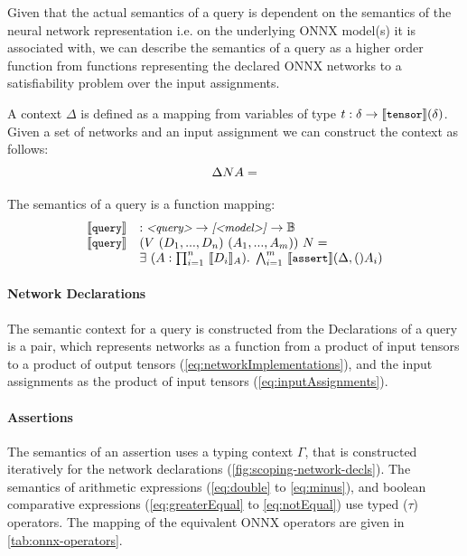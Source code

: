 Given that the actual semantics of a \vnnlib{} query is dependent on the semantics of the neural network representation i.e. on the underlying ONNX model(s) it is associated with, we can describe the semantics of a query as a higher order function from functions representing the declared ONNX networks to a satisfiability problem over the input assignments. 

A context $\Delta$ is defined as a mapping from variables of type $t : \delta \rightarrow \llbracket \texttt{\small tensor} \rrbracket(\delta)$. Given a set of networks and an input assignment we can construct the context as follows:
\begin{equation*}
\Delta N A =  
\end{equation*}


The semantics of a query is a function mapping:
\begin{equation*}
\begin{array}{lll}
\llbracket \texttt{\small query} \rrbracket & : \text{\small \textit{<query>}} \rightarrow \text{\small \textit{[<model>]}} \rightarrow \mathbb{B} \\
\llbracket \texttt{\small query} \rrbracket & (V~(D_1,...,D_n)~(A_1,...,A_m))~N = \\
    & \exists~(A : \prod^{n}_{i=1}~\llbracket D_i \rrbracket_A). \; \bigwedge^{m}_{i=1}~\llbracket \texttt{\small assert} \rrbracket(\Delta,()A_i) \\
\end{array}
\end{equation*}

 
\paragraph{Network Declarations}
The semantic context for a \vnnlib{} query is constructed from the Declarations of a \vnnlib{} query is a pair, which represents networks as a function from a product of input tensors to a product of output tensors (\autoref{eq:networkImplementations}), and the input assignments as the product of input tensors (\autoref{eq:inputAssignments}).

\paragraph{Assertions}
The semantics of an assertion uses a typing context $\Gamma$, that is constructed iteratively for the network declarations (\autoref{fig:scoping-network-decls}).
The semantics of arithmetic expressions (\autoref{eq:double} to \autoref{eq:minus}), and boolean comparative expressions (\autoref{eq:greaterEqual} to \autoref{eq:notEqual}) use typed ($\tau$) operators. The mapping of the equivalent ONNX operators \cite{onnxOperators} are given in \autoref{tab:onnx-operators}.\

